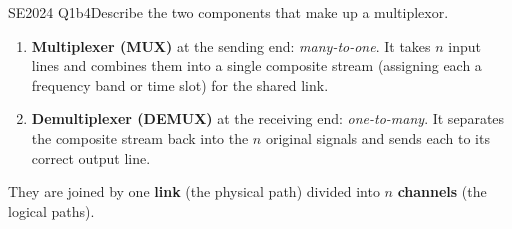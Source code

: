 \documentclass[10pt]{article}
\begin{document}
\begin{pastq}{SE2024 Q1b}{4}Describe the two components that make up a multiplexor.\end{pastq}
\begin{ans}
\begin{enumerate}
\item \textbf{Multiplexer (MUX)} at the sending end: \emph{many-to-one}. It takes $n$ input lines and combines them into a single composite stream (assigning each a frequency band or time slot) for the shared link.
\item \textbf{Demultiplexer (DEMUX)} at the receiving end: \emph{one-to-many}. It separates the composite stream back into the $n$ original signals and sends each to its correct output line.
\end{enumerate}
They are joined by one \textbf{link} (the physical path) divided into $n$ \textbf{channels} (the logical paths).
\end{ans}
\end{document}
